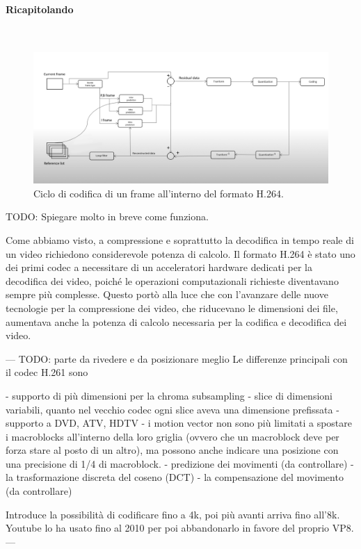 \documentclass[a4paper,12pt, oneside]{article}
\begin{document}
\paragraph{Ricapitolando}\hphantom{A}\\
\begin{figure}[h]
    \centering
    \includegraphics[width=1\textwidth]{images/h264-coding-loop.png}
    \caption{Ciclo di codifica di un frame all'interno del formato H.264.}
    \label{fig:h264_coding_loop}
\end{figure}
TODO: Spiegare molto in breve come funziona.

Come abbiamo visto, a compressione e soprattutto la decodifica in tempo reale di un video richiedono
considerevole potenza di calcolo. Il formato H.264 è stato uno dei primi codec a necessitare di un
acceleratori hardware dedicati per la decodifica dei video, poiché le operazioni computazionali richieste
diventavano sempre più complesse. Questo portò alla luce che con l'avanzare delle nuove tecnologie per
la compressione dei video, che riducevano le dimensioni dei file, aumentava anche la potenza di calcolo
necessaria per la codifica e decodifica dei video.

---
TODO: parte da rivedere e da posizionare meglio
Le differenze principali con il codec H.261 sono

- supporto di più dimensioni per la chroma subsampling
- slice di dimensioni variabili, quanto nel vecchio codec ogni slice aveva una dimensione prefissata
- supporto a DVD, ATV, HDTV
- i motion vector non sono più limitati a spostare i macroblocks all'interno della loro griglia
(ovvero che un macroblock deve per forza stare al posto di un altro), ma possono anche indicare una
posizione con una precisione di 1/4 di macroblock.
- predizione dei movimenti  (da controllare)
- la trasformazione discreta del coseno (DCT)
- la compensazione del movimento (da controllare)

Introduce la possibilità di codificare fino a 4k, poi più avanti arriva fino all'8k.
Youtube lo ha usato fino al 2010 per poi abbandonarlo in favore del proprio VP8.
---
\end{document}
